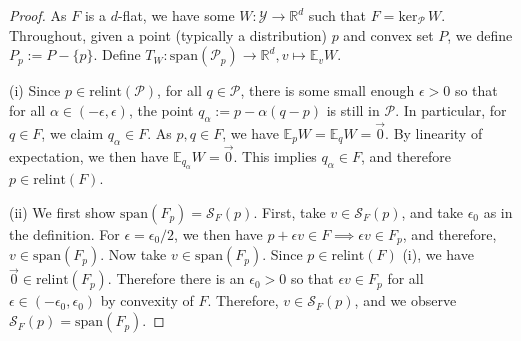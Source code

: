 \documentclass[11pt]{article} %
\newcommand{\Comments}{1}
\newcommand{\mynote}[2]{\ifnum\Comments=1\textcolor{#1}{#2}\fi}
\newcommand{\mytodo}[2]{\ifnum\Comments=1%
	\todo[linecolor=#1!80!black,backgroundcolor=#1,bordercolor=#1!80!black]{#2}\fi}
\newcommand{\raf}[1]{\mynote{green}{[RF: #1]}}
\newcommand{\raft}[1]{\mytodo{green!20!white}{RF: #1}}
\newcommand{\reals}{\mathbb{R}}
\newcommand{\relint}[1]{\mathrm{relint}(#1)}
\newcommand{\spn}{\mathrm{span}}
\newcommand{\zeros}[1]{\mathrm{ker}_\P\,#1}
\newcommand{\E}{\mathbb{E}}
\renewcommand{\P}{\mathcal{P}}
\newcommand{\Scr}{\mathcal{S}}  %
\newcommand{\Y}{\mathcal{Y}}
\begin{document}
\begin{proof}
  
  As $F$ is a $d$-flat, we have some $W:\Y \to \reals^d$ such that $F = \zeros{W}$.
  Throughout, given a point (typically a distribution) $p$ and convex set $P$, we define $P_p := P - \{p\}$.
  Define $T_W:\spn(\P_p)\to\reals^d, v\mapsto \E_v W$.
  
  (i)
  Since $p \in \relint{\P}$, for all $q \in \P$, there is some small enough $\epsilon > 0 $ so that for all $\alpha \in (-\epsilon,\epsilon)$, the point $q_\alpha := p - \alpha(q - p)$ is still in $\P$.
  In particular, for $q \in F$, we claim $q_\alpha \in F$.
  As $p,q \in F$, we have $\E_pW = \E_qW = \vec 0$.
  By linearity of expectation, we then have $\E_{q_\alpha} W = \vec 0$.
  This implies $q_\alpha \in F$, and therefore $p \in \relint{F}$.
  
  (ii)
  We first show $\spn(F_p) = \Scr_F(p)$.
  First, take $v \in \Scr_F(p)$, and take $\epsilon_0$ as in the definition.
  For $\epsilon = \epsilon_0 / 2$, we then have $p + \epsilon v \in F \implies \epsilon v \in F_p$, and therefore, $v \in \spn(F_p)$.  
  Now take $v \in \spn(F_p)$.
  Since $p \in \relint{F}$ (i), we have $\vec 0 \in \relint{F_p}$.
  Therefore there is an $\epsilon_0 > 0$ so that $\epsilon v \in F_p$ for all $\epsilon \in (-\epsilon_0, \epsilon_0)$ by convexity of $F$.
  Therefore, $v \in \Scr_F(p)$, and we observe $\Scr_F(p) = \spn(F_p)$.
  

\end{proof}
\end{document}
